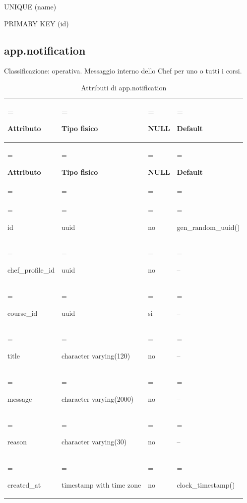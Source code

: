 \documentclass[11pt,a4paper]{article}
\begin{document}
{\ttfamily\small UNIQUE (\allowbreak{}name)}\par

{\ttfamily\small PRIMARY KEY (\allowbreak{}id)}\par

\subsection{app.notification}

Classificazione: operativa. Messaggio interno dello Chef per uno o tutti i corsi.

{\small \renewcommand{\arraystretch}{1.2}

\begin{xltabular}{\linewidth}{>{\hsize\linewidth=\hsize\raggedright\arraybackslash}X>{\hsize\linewidth=\hsize\raggedright\arraybackslash}X>{\hsize\linewidth=\hsize\raggedright\arraybackslash}X>{\hsize\linewidth=\hsize\raggedright\arraybackslash}X}
\caption{Attributi di app.notification}\label{tab:dictionary-15}\\
\toprule

\textbf{Attributo} & \textbf{Tipo fisico} & \textbf{NULL} & \textbf{Default}\\\midrule\endfirsthead\toprule\textbf{Attributo} & \textbf{Tipo fisico} & \textbf{NULL} & \textbf{Default}\\\midrule\endhead
\midrule{}\\\endfoot\bottomrule\endlastfoot


{\ttfamily\small id} & {\ttfamily\small uuid} & no & {\ttfamily\small gen\_\allowbreak{}random\_\allowbreak{}uuid(\allowbreak{})}\\\addlinespace[3pt]

{\ttfamily\small chef\_\allowbreak{}profile\_\allowbreak{}id} & {\ttfamily\small uuid} & no & {\ttfamily\small --}\\\addlinespace[3pt]

{\ttfamily\small course\_\allowbreak{}id} & {\ttfamily\small uuid} & sì & {\ttfamily\small --}\\\addlinespace[3pt]

{\ttfamily\small title} & {\ttfamily\small character varying(\allowbreak{}120)} & no & {\ttfamily\small --}\\\addlinespace[3pt]

{\ttfamily\small message} & {\ttfamily\small character varying(\allowbreak{}2000)} & no & {\ttfamily\small --}\\\addlinespace[3pt]

{\ttfamily\small reason} & {\ttfamily\small character varying(\allowbreak{}30)} & no & {\ttfamily\small --}\\\addlinespace[3pt]

{\ttfamily\small created\_\allowbreak{}at} & {\ttfamily\small timestamp with time zone} & no & {\ttfamily\small clock\_\allowbreak{}timestamp(\allowbreak{})}\\*

\end{xltabular}}
\end{document}
